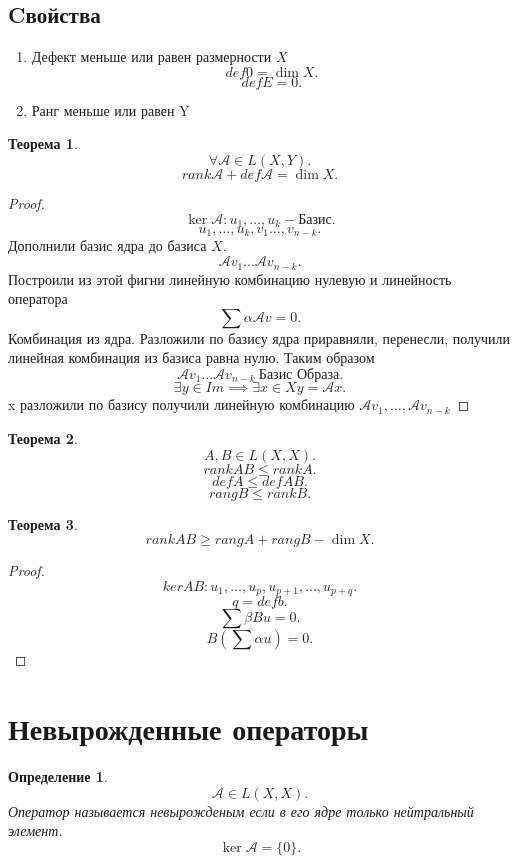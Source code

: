 \documentclass{scrartcl}
\newtheorem{theorem}{Теорема}
\newtheorem{definition}{Определение}
\begin{document}
\subsection{Cвойства}
\begin{enumerate}
    \item Дефект меньше или равен размерности $X$
        \[
            def 0 = \dim{X}
        .\] 
        \[
        def E = 0
        .\] 
    \item Ранг меньше или равен Y
\end{enumerate}
\begin{theorem}
    \[
        \forall  \mathcal{A} \in L(X,Y)
    .\] 
    \[
        rank \mathcal{A} + def \mathcal{A} = \dim X
    .\] 
\end{theorem}
\begin{proof}
    \[
        \ker{\mathcal{A}} : u_1,\dots,u_{k} - \text{Базис}
    .\] 
    \[
    u_1,\dots,u_{k} , v_1 \dots, v_{n - k}
    .\] 
    Дополнили базис ядра до базиса $X$.
    \[
        \mathcal{A} v_1 \dots \mathcal{A} v_{n - k}
    .\] 
    Построили из этой фигни линейную комбинацию нулевую и линейность оператора
    \[
        \sum \alpha \mathcal{A} v = 0
    .\] 
    Комбинация из ядра. Разложили по базису ядра приравняли, перенесли, получили линейная комбинация из базиса равна нулю.
    Таким образом
    \[
        \mathcal{A} v_1 \dots \mathcal{A} v_{n - k} ~ \text{Базис Образа}
    .\] 
    \[
        \exists  y \in Im \implies \exists  x \in X y = \mathcal{A}x
    .\] 
    x разложили по базису получили линейную комбинацию $\mathcal{A} v_1,\dots, \mathcal{A} v_{n - k} $
\end{proof}
\begin{theorem}
    \[
    A,B \in L(X,X)
    .\] 
    \[
    rank AB\le  rank A
    .\] 
    \[
    def A \le def AB
    .\] 
    \[
    rang B \le  rank B
    .\] 
\end{theorem}
\begin{theorem}
    \[
        rank AB \ge rang A + rang B - \dim{X}
    .\] 
\end{theorem}
\begin{proof}
    \[
    ker AB : u_1,\dots,u_{p},u_{p + 1}, \dots, u_{p+q}
    .\] 
    \[
    q = def b
    .\] 
    \[
        \sum \beta B u = 0
    .\] 
    \[
    B(\sum \alpha u ) = 0
    .\] 
\end{proof}
\section{Невырожденные операторы}
\begin{definition}
    \[
        \mathcal{A} \in L(X,X)
    .\] 
    Оператор называется невырожденым если в его ядре только нейтральный элемент.
    \[
        \ker{\mathcal{A}} = \{0\}
    .\] 
\end{definition}
\end{document}
